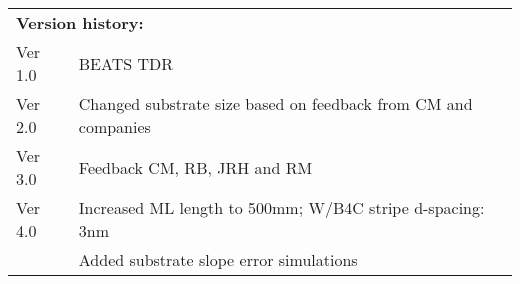 \begin{center}
\begin{tabular}[bhp]{|p{} p{}|}
\hline
\multicolumn{2}{|l|}{\textbf{Version history:}} \\
\multicolumn{1}{|l}{Ver 1.0}  & \multicolumn{1}{l|}{BEATS TDR}  \\
\multicolumn{1}{|l}{Ver 2.0}  & \multicolumn{1}{l|}{Changed substrate size based on feedback from CM and companies}  \\
\multicolumn{1}{|l}{Ver 3.0}  & \multicolumn{1}{l|}{Feedback CM, RB, JRH and RM}  \\
\multicolumn{1}{|l}{Ver 4.0}  & \multicolumn{1}{l|}{Increased ML length to 500mm; W/B4C stripe d-spacing: 3nm}  \\
\multicolumn{1}{|l}{}  & \multicolumn{1}{l|}{Added substrate slope error simulations}  \\
\hline
\end{tabular}
\end{center}